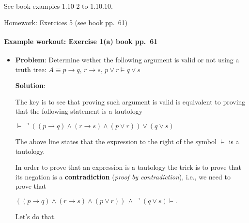See book examples 1.10-2 to 1.10.10.

Homework: Exercices 5 (see book pp.~61)

\paragraph{Example workout: Exercise 1(a) book
pp.~61}\label{example-workout-exercise-1a-book-pp.61}

\begin{itemize}
\item
  \textbf{Problem}: Determine wether the following argument is valid or
  not using a truth tree:
  \(A\equiv p\rightarrow q,\,r\rightarrow s,\,p\vee r\vDash q\vee s\)

  \textbf{Solution}:

  The key is to see that proving such argument is valid is equivalent to
  proving that the following statement is a tautology

  \(\vDash\,\urcorner\left( (p\rightarrow q) \wedge (r\rightarrow s) \wedge (p\vee r)\right) \vee (q\vee s)\)

  The above line states that the expression to the right of the symbol
  \(\vDash\) is a tautology.

  In order to prove that an expression is a tautology the trick is to
  prove that its negation is a \textbf{contradiction} (\emph{proof by
  contradiction}), i.e., we need to prove that

  \(\left( (p\rightarrow q) \wedge (r\rightarrow s) \wedge (p\vee r)\right) \,\wedge \, \urcorner (q\vee s) \vDash .\)

  Let's do that.


\end{itemize}
